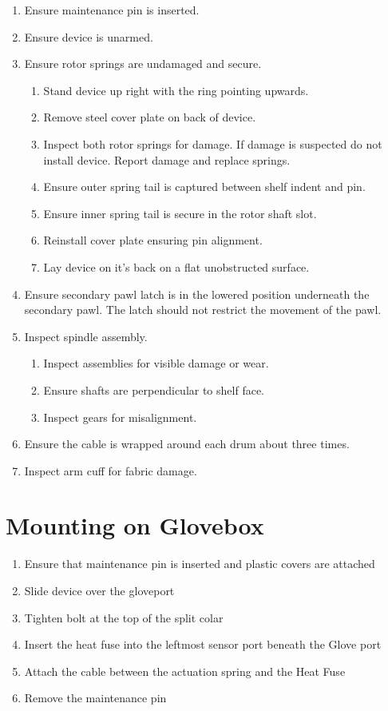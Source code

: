 \documentclass[12pt, a4paper]{report}
\begin{document}
\begin{enumerate}
    \item Ensure maintenance pin is inserted.
    \item Ensure device is unarmed. 
    \item Ensure rotor springs are undamaged and secure. 
    \begin{enumerate}
        \item Stand device up right with the ring pointing upwards. 
        \item Remove steel cover plate on back of device. 
        \item Inspect both rotor springs for damage. If damage is suspected do not install device. Report damage and replace springs. 
        \item Ensure outer spring tail is captured between shelf indent and pin. 
        \item Ensure inner spring tail is secure in the rotor shaft slot. 
        \item Reinstall cover plate ensuring pin alignment. 
        \item Lay device on it's back on a flat unobstructed surface. 
    \end{enumerate}
    \item Ensure secondary pawl latch is in the lowered position underneath the secondary pawl. The latch should not restrict the movement of the pawl. 
    \item Inspect spindle assembly. 
    \begin{enumerate}
        \item Inspect assemblies for visible damage or wear. 
        \item Ensure shafts are perpendicular to shelf face. 
        \item Inspect gears for misalignment. 
    \end{enumerate}
    \item Ensure the cable is wrapped around each drum about three times. 
    \item Inspect arm cuff for fabric damage. 
\end{enumerate}
\section{Mounting on Glovebox}
    \begin{enumerate}
        \item Ensure that maintenance pin is inserted and plastic covers are attached
        \item Slide device over the gloveport
        \item Tighten bolt at the top of the split colar
        \item Insert the heat fuse into the leftmost sensor port beneath the Glove port
        \item Attach the cable between the actuation spring and the Heat Fuse
        \item Remove the maintenance pin
    \end{enumerate}
\end{document}

